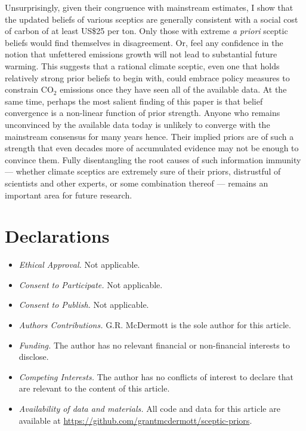 \documentclass[smallextended]{svjour3}       %
\begin{document}
Unsurprisingly, given their congruence with mainstream estimates, I show
that the updated beliefs of various sceptics are generally consistent
with a social cost of carbon of at least US\$25 per ton. Only those with
extreme \emph{a priori} sceptic beliefs would find themselves in
disagreement. Or, feel any confidence in the notion that unfettered
emissions growth will not lead to substantial future warming. This
suggests that a rational climate sceptic, even one that holds relatively
strong prior beliefs to begin with, could embrace policy measures to
constrain CO\(_2\) emissions once they have seen all of the available
data. At the same time, perhaps the most salient finding of this paper
is that belief convergence is a non-linear function of prior strength.
Anyone who remains unconvinced by the available data today is unlikely
to converge with the mainstream consensus for many years hence. Their
implied priors are of such a strength that even decades more of
accumulated evidence may not be enough to convince them. Fully
disentangling the root causes of such information immunity --- whether
climate sceptics are extremely sure of their priors, distrustful of
scientists and other experts, or some combination thereof --- remains an
important area for future research.

\hypertarget{declarations}{%
\section*{Declarations}\label{declarations}}

\begin{itemize}
\item
  \emph{Ethical Approval.} Not applicable.
\item
  \emph{Consent to Participate.} Not applicable.
\item
  \emph{Consent to Publish.} Not applicable.
\item
  \emph{Authors Contributions.} G.R. McDermott is the sole author for
  this article.
\item
  \emph{Funding.} The author has no relevant financial or non-financial
  interests to disclose.
\item
  \emph{Competing Interests.} The author has no conflicts of interest to
  declare that are relevant to the content of this article.
\item
  \emph{Availability of data and materials.} All code and data for this
  article are available at
  \url{https://github.com/grantmcdermott/sceptic-priors}.
\end{itemize}



\end{document}
